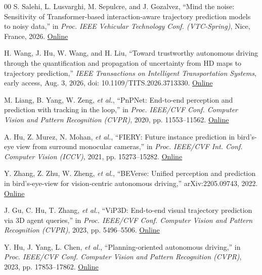 \documentclass[lettersize,journal]{IEEEtran}
\begin{document}
\begin{thebibliography}{00}
 S. Salehi, L. Lusvarghi, M. Sepulcre, and J. Gozalvez, ``Mind the noise: Sensitivity of Transformer-based interaction-aware trajectory prediction models to noisy data,'' in \textit{Proc. IEEE Vehicular Technology Conf. (VTC-Spring)}, Nice, France, 2026. \href{https://doi.org/10.48550/arXiv.2606.21344}{Online}

 H. Wang, J. Hu, W. Wang, and H. Liu, ``Toward trustworthy autonomous driving through the quantification and propagation of uncertainty from HD maps to trajectory prediction,'' \textit{IEEE Transactions on Intelligent Transportation Systems}, early access, Aug. 3, 2026, doi: 10.1109/TITS.2026.3713330. \href{https://doi.org/10.1109/TITS.2026.3713330}{Online}

 M. Liang, B. Yang, W. Zeng, \textit{et al.}, ``PnPNet: End-to-end perception and prediction with tracking in the loop,'' in \textit{Proc. IEEE/CVF Conf. Computer Vision and Pattern Recognition (CVPR)}, 2020, pp. 11553--11562. \href{https://openaccess.thecvf.com/content_CVPR_2020/html/Liang_PnPNet_End-to-End_Perception_and_Prediction_With_Tracking_in_the_Loop_CVPR_2020_paper.html}{Online}

 A. Hu, Z. Murez, N. Mohan, \textit{et al.}, ``FIERY: Future instance prediction in bird's-eye view from surround monocular cameras,'' in \textit{Proc. IEEE/CVF Int. Conf. Computer Vision (ICCV)}, 2021, pp. 15273--15282. \href{https://openaccess.thecvf.com/content/ICCV2021/html/Hu_FIERY_Future_Instance_Prediction_in_Birds-Eye_View_From_Surround_Monocular_ICCV_2021_paper.html}{Online}

 Y. Zhang, Z. Zhu, W. Zheng, \textit{et al.}, ``BEVerse: Unified perception and prediction in bird's-eye-view for vision-centric autonomous driving,'' arXiv:2205.09743, 2022. \href{https://arxiv.org/abs/2205.09743}{Online}

 J. Gu, C. Hu, T. Zhang, \textit{et al.}, ``ViP3D: End-to-end visual trajectory prediction via 3D agent queries,'' in \textit{Proc. IEEE/CVF Conf. Computer Vision and Pattern Recognition (CVPR)}, 2023, pp. 5496--5506. \href{https://openaccess.thecvf.com/content/CVPR2023/html/Gu_ViP3D_End-to-End_Visual_Trajectory_Prediction_via_3D_Agent_Queries_CVPR_2023_paper.html}{Online}

 Y. Hu, J. Yang, L. Chen, \textit{et al.}, ``Planning-oriented autonomous driving,'' in \textit{Proc. IEEE/CVF Conf. Computer Vision and Pattern Recognition (CVPR)}, 2023, pp. 17853--17862. \href{https://openaccess.thecvf.com/content/CVPR2023/html/Hu_Planning-Oriented_Autonomous_Driving_CVPR_2023_paper.html}{Online}


\end{thebibliography}
\end{document}
